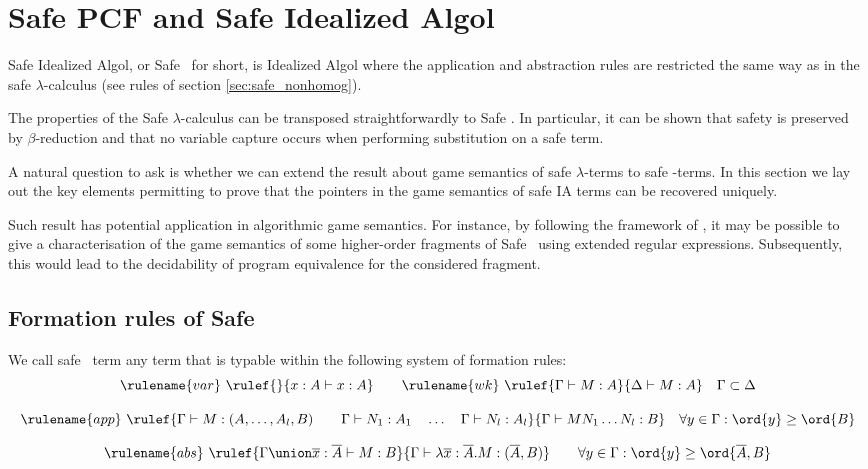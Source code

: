 \section{Safe PCF and Safe Idealized Algol}

Safe Idealized Algol, or Safe \ialgol\ for short, is Idealized Algol where the application and abstraction rules are restricted
the same way as in the safe $\lambda$-calculus (see rules of section \ref{sec:safe_nonhomog}).

The properties of the Safe $\lambda$-calculus can be transposed straightforwardly to Safe \ialgol.
In particular, it can be shown that safety is preserved by $\beta$-reduction and that
no variable capture occurs when performing substitution on a safe term.

A natural question to ask is whether we can extend the result about game semantics of safe $\lambda$-terms to safe \ialgol-terms.
In this section we lay out the key elements permitting to prove that the pointers in the game semantics of
safe IA terms can be recovered uniquely.

Such result has potential application in algorithmic game semantics.
For instance, by following the framework of \cite{ghicamccusker00}, it may be possible to give
a characterisation of the game semantics of some higher-order fragments of Safe \ialgol\ using
extended regular expressions. Subsequently, this would lead to the decidability of program equivalence
for the considered fragment.


\subsection{Formation rules of Safe \ialgol}
We call safe \ialgol\ term any term that is typable within the following system of formation rules:
$$ \rulename{var} \   \rulef{}{x : A\vdash x : A}
\qquad  \rulename{wk} \   \rulef{\Gamma \vdash M : A}{\Delta \vdash M : A} \quad  \Gamma \subset \Delta$$

$$ \rulename{app} \  \rulef{\Gamma \vdash M : (A,\ldots,A_l,B)
                                        \qquad \Gamma \vdash N_1 : A_1
                                        \quad \ldots \quad \Gamma \vdash N_l : A_l  }
                                   {\Gamma  \vdash M N_1 \ldots N_l : B}
                                    \quad
                                   \forall y \in \Gamma : \ord{y} \geq \ord{B}$$

$$ \rulename{abs} \   \rulef{\Gamma \union \overline{x} : \overline{A} \vdash M : B}
                                   {\Gamma  \vdash \lambda \overline{x} : \overline{A} . M : (\overline{A},B)} \qquad
                                   \forall y \in \Gamma : \ord{y} \geq \ord{\overline{A},B}$$

